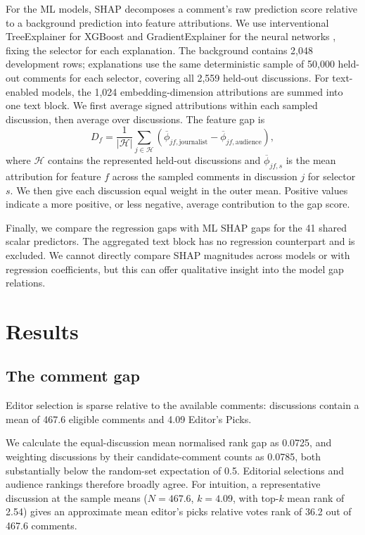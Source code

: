 For the ML models, SHAP \citep{lundberg2017unified} decomposes a comment's raw prediction score relative to a background prediction into feature attributions. We use interventional TreeExplainer for XGBoost \citep{lundberg2020local} and GradientExplainer for the neural networks \citep{erion2021improving}, fixing the selector for each explanation. The background contains 2,048 development rows; explanations use the same deterministic sample of 50,000 held-out comments for each selector, covering all 2,559 held-out discussions. For text-enabled models, the 1,024 embedding-dimension attributions are summed into one text block. We first average signed attributions within each sampled discussion, then average over discussions. The feature gap is
\begin{equation}
D_f=\frac{1}{|\mathcal{H}|}\sum_{j\in\mathcal{H}}\left(
\overline{\phi}_{jf,\mathrm{journalist}}-
\overline{\phi}_{jf,\mathrm{audience}}\right),
\end{equation}
where $\mathcal{H}$ contains the represented held-out discussions and $\overline{\phi}_{jf,s}$ is the mean attribution for feature $f$ across the sampled comments in discussion $j$ for selector $s$. We then give each discussion equal weight in the outer mean. Positive values indicate a more positive, or less negative, average contribution to the gap score.

Finally, we compare the regression gaps with ML SHAP gaps for the 41 shared scalar predictors. The aggregated text block has no regression counterpart and is excluded. We cannot directly compare SHAP magnitudes across models or with regression coefficients, but this can offer qualitative insight into the model gap relations.

\section{Results}
\subsection{The comment gap}

Editor selection is sparse relative to the available comments: discussions contain a mean of 467.6 eligible comments and 4.09 Editor's Picks.

We calculate the equal-discussion mean normalised rank gap as 0.0725, and weighting discussions by their candidate-comment counts as 0.0785, both substantially below the random-set expectation of 0.5. Editorial selections and audience rankings therefore broadly agree. For intuition, a representative discussion at the sample means ($N=467.6$, $k=4.09$, with top-$k$ mean rank of 2.54) gives an approximate mean editor's picks relative votes rank of 36.2 out of 467.6 comments.

